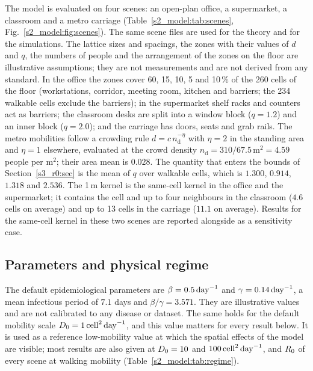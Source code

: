 The model is evaluated on four scenes: an open-plan office, a supermarket, a classroom and a metro carriage
(Table~\ref{s2_model:tab:scenes}, Fig.~\ref{s2_model:fig:scenes}). The same scene files are used for the
theory and for the simulations. The lattice sizes and spacings, the zones with their values of $d$ and $q$,
the numbers of people and the arrangement of the zones on the floor are illustrative assumptions; they are not
measurements and are not derived from any standard. In the office the zones cover 60, 15, 10, 5 and 10\,\% of
the 260 cells of the floor (workstations, corridor, meeting room, kitchen and barriers; the 234 walkable cells
exclude the barriers); in the supermarket shelf racks and
counters act as barriers; the classroom desks are split into a window block ($q=1.2$) and an inner block
($q=2.0$); and the carriage has doors, seats and grab rails.
The metro mobilities follow a crowding rule $d=c\,n_{\mathrm{d}}^{-\eta}$ with $\eta=2$ in the standing area
and $\eta=1$ elsewhere, evaluated at the crowd density $n_{\mathrm{d}}=310/67.5\,\mathrm{m}^2=4.59$ people per
$\mathrm{m}^2$; their area
mean is $0.028$.
The quantity that enters the bounds of Section~\ref{s3_r0:sec} is the mean of $q$ over walkable cells, which
is $1.300$, $0.914$, $1.318$ and $2.536$. The 1\,m kernel is the same-cell kernel in the office and the
supermarket; it contains the cell and up to four neighbours in the classroom ($4.6$ cells on average) and up
to 13 cells in the carriage ($11.1$ on average). Results for the same-cell kernel in these two scenes are
reported alongside as a sensitivity case.

\subsection{Parameters and physical regime}\label{s2_model:sec:regime}

The default epidemiological parameters are $\beta=0.5\,\mathrm{day}^{-1}$ and $\gamma=0.14\,\mathrm{day}^{-1}$, a mean infectious
period of $7.1$ days and $\beta/\gamma=3.571$. They are illustrative values and are not calibrated to any
disease or dataset. The same holds for the default mobility scale $D_0=1\,\mathrm{cell}^2\,\mathrm{day}^{-1}$, and this value matters
for every result below. It is used as a reference low-mobility value at which the spatial effects of the model
are visible; most results are also given at $D_0=10$ and
$100\,\mathrm{cell}^2\,\mathrm{day}^{-1}$, and $R_0$ of every scene at walking mobility (Table~\ref{s2_model:tab:regime}).

